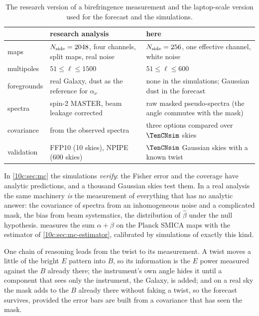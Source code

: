 \begin{table}[htbp]
\centering
\small
\begin{tabularx}{\linewidth}{@{}>{\raggedright\arraybackslash}p{2.6cm}>{\raggedright\arraybackslash}X>{\raggedright\arraybackslash}X@{}}
\toprule
 & research analysis & here\\\midrule
maps & $N_{\rm side}=2048$, four channels, split maps, real noise & $N_{\rm side}=256$, one effective channel, white noise\\
multipoles & $51\le\ell\le1500$ & $51\le\ell\le600$\\
foregrounds & real Galaxy, dust as the reference for $\alpha_\nu$ & none in the simulations; Gaussian dust in the forecast\\
spectra & spin-2 MASTER, beam leakage corrected & raw masked pseudo-spectra (the angle commutes with the mask)\\
covariance & from the observed spectra & three options compared over $\TenCNsim$ skies\\
validation & FFP10 (10 skies), NPIPE (600 skies) & $\TenCNsim$ Gaussian skies with a known twist\\
\bottomrule
\end{tabularx}
\caption{The research version of a birefringence measurement and the laptop-scale version used for the forecast and the simulations.}
\label{10c:tab:laptop}
\end{table}

\begin{inpractice}
In \cref{10c:sec:mc} the simulations \emph{verify}: the Fisher error and the coverage have analytic predictions, and a
thousand Gaussian skies test them. In a real analysis the same machinery \emph{is} the measurement of everything
that has no analytic answer: the covariance of spectra from an inhomogeneous noise and a complicated mask, the bias
from beam systematics, the distribution of $\hat\beta$ under the null hypothesis.  measures the sum
$\alpha+\beta$ on the Planck SMICA maps with the estimator of \cref{10c:sec:mc-estimator}, calibrated by simulations of
exactly this kind.
\end{inpractice}

One chain of reasoning leads from the twist to its measurement. A twist moves a little of the bright $E$ pattern into $B$, so its
information is the $E$ power measured against the $B$ already there; the instrument's own angle hides it until a
component that sees only the instrument, the Galaxy, is added; and on a real sky the mask adds to the $B$ already
there without faking a twist, so the forecast survives, provided the error bars are built from a covariance that
has seen the mask.

